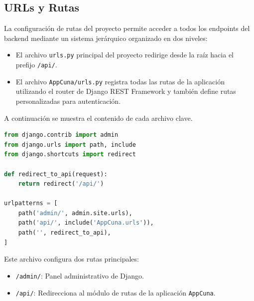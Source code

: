 \documentclass{article}
\begin{document}
    \subsection{URLs y Rutas}

La configuración de rutas del proyecto permite acceder a todos los endpoints del backend mediante un sistema jerárquico organizado en dos niveles:

\begin{itemize}
    \item El archivo \texttt{urls.py} principal del proyecto redirige desde la raíz hacia el prefijo \texttt{/api/}.
    \item El archivo \texttt{AppCuna/urls.py} registra todas las rutas de la aplicación utilizando el router de Django REST Framework y también define rutas personalizadas para autenticación.
\end{itemize}

A continuación se muestra el contenido de cada archivo clave.

\begin{lstlisting}[language=Python, caption={Archivo MyDjangoProject/urls.py}]
from django.contrib import admin
from django.urls import path, include
from django.shortcuts import redirect

def redirect_to_api(request):
    return redirect('/api/')

urlpatterns = [
    path('admin/', admin.site.urls),
    path('api/', include('AppCuna.urls')),
    path('', redirect_to_api),  
]
\end{lstlisting}

Este archivo configura dos rutas principales:
\begin{itemize}
    \item \texttt{/admin/}: Panel administrativo de Django.
    \item \texttt{/api/}: Redirecciona al módulo de rutas de la aplicación \texttt{AppCuna}.
\end{itemize}
\end{document}
